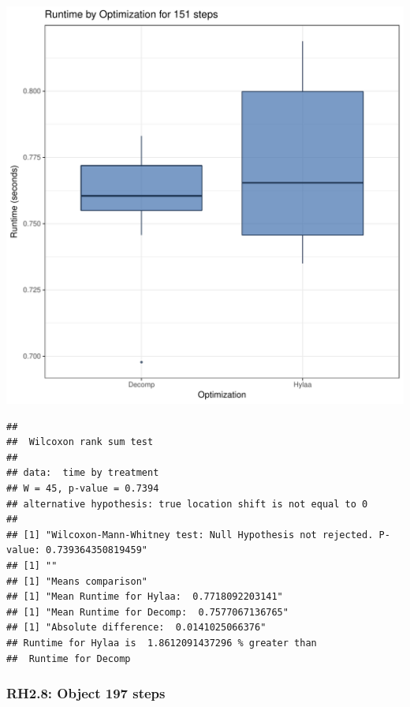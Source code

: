 \documentclass{article}\usepackage[]{graphicx}\usepackage[]{color}
\makeatletter
\def\maxwidth{ %
  \ifdim\Gin@nat@width>\linewidth
    \linewidth
  \else
    \Gin@nat@width
  \fi
}
\newenvironment{kframe}{%
 \def\at@end@of@kframe{}%
 \ifinner\ifhmode%
  \def\at@end@of@kframe{\end{minipage}}%
  \begin{minipage}{\columnwidth}%
 \fi\fi%
 \def\FrameCommand##1{\hskip\@totalleftmargin \hskip-\fboxsep
 \colorbox{shadecolor}{##1}\hskip-\fboxsep
     \hskip-\linewidth \hskip-\@totalleftmargin \hskip\columnwidth}%
 \MakeFramed {\advance\hsize-\width
   \@totalleftmargin\z@ \linewidth\hsize
   \@setminipage}}%
 {\par\unskip\endMakeFramed%
 \at@end@of@kframe}
\newenvironment{knitrout}{}{} %
\makeatother
\begin{document}
\begin{knitrout}
\color{fgcolor}
\includegraphics[width=\maxwidth]{figure/RH2_steps151-1} 
\begin{kframe}\begin{verbatim}
## 
## 	Wilcoxon rank sum test
## 
## data:  time by treatment
## W = 45, p-value = 0.7394
## alternative hypothesis: true location shift is not equal to 0
## 
## [1] "Wilcoxon-Mann-Whitney test: Null Hypothesis not rejected. P-value: 0.739364350819459"
## [1] ""
## [1] "Means comparison"
## [1] "Mean Runtime for Hylaa:  0.7718092203141"
## [1] "Mean Runtime for Decomp:  0.7577067136765"
## [1] "Absolute difference:  0.0141025066376"
## Runtime for Hylaa is  1.8612091437296 % greater than 
##  Runtime for Decomp
\end{verbatim}
\end{kframe}
\end{knitrout}


\subsubsection{RH2.8: Object 197 steps}
\end{document}
